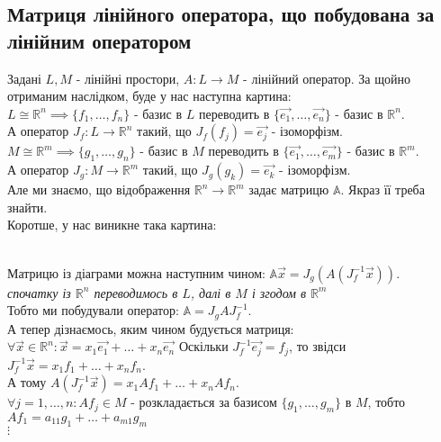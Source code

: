 \documentclass[a4paper, 10pt]{article}
\theoremstyle{theoremdd}
\begin{document}
	\subsection{Матриця лінійного оператора, що побудована за лінійним оператором}
	Задані $L,M$ - лінійні простори, $A: L \to M$ - лінійний оператор. За щойно отриманим наслідком, буде у нас наступна картина:\\
	$L \cong \mathbb{R}^n \implies \{f_1,\dots,f_n\}$ - базис в $L$ переводить в $\{\vec{e_1},\dots,\vec{e_n}\}$ - базис в $\mathbb{R}^n$. \\ 
	А оператор $J_f: L \to \mathbb{R}^n$ такий, що $J_f(f_j) = \vec{e_j}$ - ізоморфізм.
	\bigskip \\
	$M \cong \mathbb{R}^m \implies \{g_1,\dots,g_n\}$ - базис в $M$ переводить в $\{\vec{e_1},\dots,\vec{e_m}\}$ - базис в $\mathbb{R}^m$. \\
	А оператор $J_g: M \to \mathbb{R}^m$ такий, що $J_g(g_k) = \vec{e_k}$ - ізоморфізм.\\
	Але ми знаємо, що відображення $\mathbb{R}^n \to \mathbb{R}^m$ задає матрицю $\mathbb{A}$. Якраз її треба знайти.
	\\
	Коротше, у нас виникне така картина:\\
	\\
	Матрицю із діаграми можна наступним чином: $\mathbb{A}\vec{x} = J_g(A(J^{-1}_f\vec{x}))$.\\
	\textit{спочатку із $\mathbb{R}^n$ переводимось в $L$, далі в $M$ і згодом в $\mathbb{R}^m$}\\
	Тобто ми побудували оператор: $\mathbb{A} = J_g A J_f^{-1}$.\\
	А тепер дізнаємось, яким чином будується матриця:\\
	$\forall \vec{x} \in \mathbb{R}^n: \vec{x} = x_1 \vec{e_1}+ \dots + x_n \vec{e_n}$
	Оскільки $J_f^{-1} \vec{e_j} = f_j$, то звідси $J_f^{-1} \vec{x} = x_1f_1+\dots+x_nf_n$. \\ А тому $A(J_f^{-1}\vec{x}) = x_1Af_1 + \dots + x_nAf_n$.\\
	$\forall j = 1,\dots,n: Af_j \in M$ - розкладається за базисом $\{g_1,\dots,g_m\}$ в $M$, тобто\\
	$Af_1 = a_{11}g_1 + \dots + a_{m1}g_m$\\
	$\vdots$\\
\end{document}
